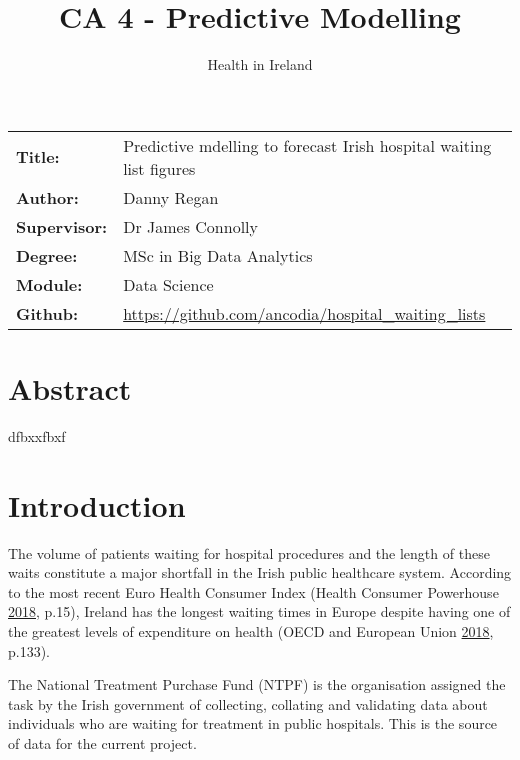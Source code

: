 \documentclass[
  12pt,
]{article}
\title{CA 4 - Predictive Modelling}
\subtitle{Health in Ireland}
\author{}
\date{\vspace{-2.5em}}
\begin{document}
\maketitle

\setcounter{page}{1}
\renewcommand{\arraystretch}{1.5}
\renewcommand{\footnotesize}{\small \justify}

\begingroup
\setlength{\tabcolsep}{15pt} 
\renewcommand{\arraystretch}{1.5} 
  \begin{tabular}[]{@{}ll@{}}
    \bf Title:      & Predictive mdelling to forecast Irish hospital waiting list figures \\
    \bf Author:     & Danny Regan \\
    \bf Supervisor: & Dr James Connolly \\
    \bf Degree:     & MSc in Big Data Analytics \\
    \bf Module:     & Data Science \\
    \bf Github:     & \url{https://github.com/ancodia/hospital_waiting_lists}
  \end{tabular}
\endgroup

\hypertarget{abstract}{%
\section{Abstract}\label{abstract}}

dfbxxfbxf

\newpage

\hypertarget{introduction}{%
\section{Introduction}\label{introduction}}

The volume of patients waiting for hospital procedures and the length of these waits constitute a major shortfall in the Irish public healthcare system. According to the most recent Euro Health Consumer Index (Health Consumer Powerhouse \protect\hyperlink{ref-health_consumer_powerhouse_euro_2018}{2018}, p.15), Ireland has the longest waiting times in Europe despite having one of the greatest levels of expenditure on health (OECD and European Union \protect\hyperlink{ref-oecd_health_2018}{2018}, p.133).

The National Treatment Purchase Fund (NTPF) is the organisation assigned the task by the Irish government of collecting, collating and validating data about individuals who are waiting for treatment in public hospitals. This is the source of data for the current project.
\end{document}

